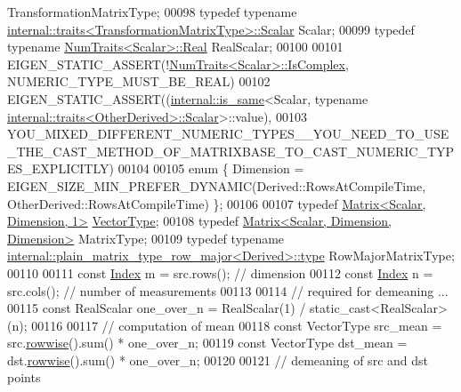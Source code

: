 \begin{DoxyCode}
       TransformationMatrixType;
00098   \textcolor{keyword}{typedef} \textcolor{keyword}{typename} \hyperlink{struct_eigen_1_1internal_1_1traits}{internal::traits<TransformationMatrixType>::Scalar}
       Scalar;
00099   \textcolor{keyword}{typedef} \textcolor{keyword}{typename} \hyperlink{group___core___module_struct_eigen_1_1_num_traits}{NumTraits<Scalar>::Real} RealScalar;
00100 
00101   EIGEN\_STATIC\_ASSERT(!\hyperlink{group___core___module_struct_eigen_1_1_num_traits}{NumTraits<Scalar>::IsComplex}, NUMERIC\_TYPE\_MUST\_BE\_REAL)
00102   EIGEN\_STATIC\_ASSERT((\hyperlink{struct_eigen_1_1internal_1_1is__same}{internal::is\_same}<Scalar, \textcolor{keyword}{typename} 
      \hyperlink{struct_eigen_1_1internal_1_1traits}{internal::traits<OtherDerived>::Scalar}>::value),
00103     
      YOU\_MIXED\_DIFFERENT\_NUMERIC\_TYPES\_\_YOU\_NEED\_TO\_USE\_THE\_CAST\_METHOD\_OF\_MATRIXBASE\_TO\_CAST\_NUMERIC\_TYPES\_EXPLICITLY)
00104 
00105   \textcolor{keyword}{enum} \{ Dimension = EIGEN\_SIZE\_MIN\_PREFER\_DYNAMIC(Derived::RowsAtCompileTime, 
      OtherDerived::RowsAtCompileTime) \};
00106 
00107   \textcolor{keyword}{typedef} \hyperlink{group___core___module_class_eigen_1_1_matrix}{Matrix<Scalar, Dimension, 1>} \hyperlink{struct_vector_type}{VectorType};
00108   \textcolor{keyword}{typedef} \hyperlink{group___core___module_class_eigen_1_1_matrix}{Matrix<Scalar, Dimension, Dimension>} MatrixType;
00109   \textcolor{keyword}{typedef} \textcolor{keyword}{typename} \hyperlink{group___core___module_class_eigen_1_1_matrix}{internal::plain\_matrix\_type\_row\_major<Derived>::type}
       RowMajorMatrixType;
00110 
00111   \textcolor{keyword}{const} \hyperlink{namespace_eigen_a62e77e0933482dafde8fe197d9a2cfde}{Index} m = src.rows(); \textcolor{comment}{// dimension}
00112   \textcolor{keyword}{const} \hyperlink{namespace_eigen_a62e77e0933482dafde8fe197d9a2cfde}{Index} n = src.cols(); \textcolor{comment}{// number of measurements}
00113 
00114   \textcolor{comment}{// required for demeaning ...}
00115   \textcolor{keyword}{const} RealScalar one\_over\_n = RealScalar(1) / \textcolor{keyword}{static\_cast<}RealScalar\textcolor{keyword}{>}(n);
00116 
00117   \textcolor{comment}{// computation of mean}
00118   \textcolor{keyword}{const} VectorType src\_mean = src.\hyperlink{group___core___module_af9662cd704ffc16c5b88c7b2d331576f}{rowwise}().sum() * one\_over\_n;
00119   \textcolor{keyword}{const} VectorType dst\_mean = dst.\hyperlink{group___core___module_af9662cd704ffc16c5b88c7b2d331576f}{rowwise}().sum() * one\_over\_n;
00120 
00121   \textcolor{comment}{// demeaning of src and dst points}

\end{DoxyCode}
